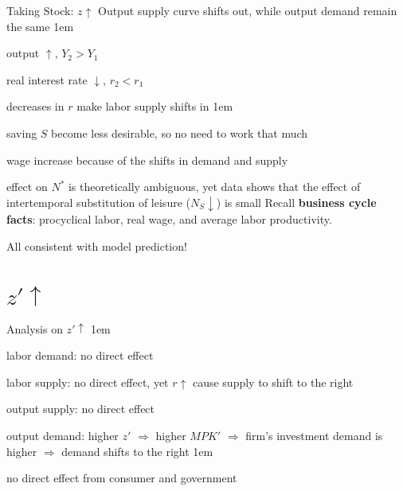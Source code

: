 \documentclass[11pt,aspectratio=43]{beamer}
\let\olditemize=\itemize
\let\endolditemize=\enditemize
\renewenvironment{itemize}{\olditemize \itemsep1em}{\endolditemize}
\theoremstyle{definition}
\begin{document}
\begin{frame}{Taking Stock: $ z \uparrow  $}
\label{slide:Taking_Stock____z__uparrow___}
    Output supply curve shifts out, while output demand remain the same
    \begin{itemize}
        \item output $ \uparrow  $, $ Y_{2} > Y_{1} $
        \item real interest rate $ \downarrow  $, $ r_{2} < r_{1} $
        \item decreases in $ r $ make labor supply shifts in
        \begin{itemize}
            \item saving $ S $ become less desirable, so no need to work that much
        \end{itemize}
        \item wage increase because of the shifts in demand and supply
        \item effect on $ N^{*} $ is theoretically ambiguous, yet data shows that the effect of intertemporal substitution of leisure ($N_{S} \downarrow $) is small
    \end{itemize}
    Recall \textbf{business cycle facts}: procyclical labor, real wage, and average labor productivity.

    All consistent with model prediction!

\end{frame}

\section{$z' \uparrow $}
\label{sec:_z___uparrow__}

\begin{frame}{Analysis on $ z' \uparrow  $}
\label{slide:Analysis_on___z___uparrow___}
    \begin{itemize}
        \item \alert{labor demand}: no direct effect
        \item \alert{labor supply}: no direct effect, yet $ r \uparrow  $ cause supply to shift to the right
        \item \alert{output supply}: no direct effect
        \item \alert{output demand}: higher $ z' $ $ \Rightarrow  $ higher $ MPK' $ $ \Rightarrow  $ firm's investment demand is higher $ \Rightarrow  $ demand shifts to the right
        \begin{itemize}
            \item no direct effect from consumer and government
        \end{itemize}
    \end{itemize}
\end{frame}
\end{document}
